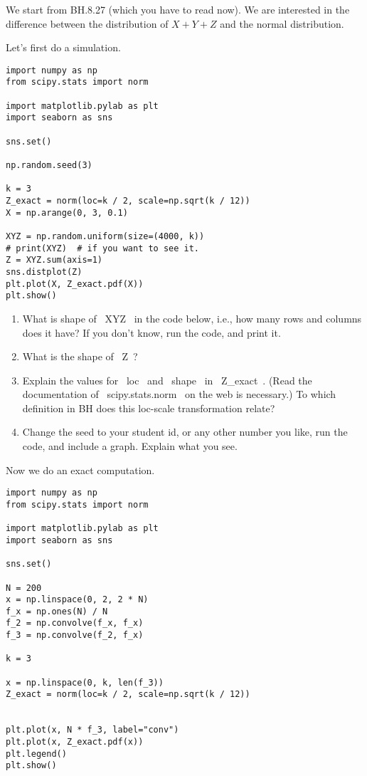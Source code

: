 \documentclass[assignments]{subfiles}
\begin{document}
\begin{exercise}
We start from BH.8.27 (which you have to read now).  We are interested in the difference between the distribution of $X+Y+Z$ and the normal distribution.

Let's first do a simulation.

\begin{verbatim}
import numpy as np
from scipy.stats import norm

import matplotlib.pylab as plt
import seaborn as sns

sns.set()

np.random.seed(3)

k = 3
Z_exact = norm(loc=k / 2, scale=np.sqrt(k / 12))
X = np.arange(0, 3, 0.1)

XYZ = np.random.uniform(size=(4000, k))
# print(XYZ)  # if you want to see it.
Z = XYZ.sum(axis=1)
sns.distplot(Z)
plt.plot(X, Z_exact.pdf(X))
plt.show()
\end{verbatim}


\begin{enumerate}
\item What is shape of ~XYZ~ in the code below, i.e., how many rows and columns does it have? If you don't know, run the code, and print it.
\item What is the shape of ~Z~?
\item Explain the values for ~loc~ and ~shape~ in ~Z_exact~. (Read the documentation of ~scipy.stats.norm~ on the web is necessary.) To which definition in BH does this loc-scale transformation relate?
\item Change the seed to your student id, or any other number you like, run the code, and include a graph. Explain what you see.
\end{enumerate}

Now we do an exact computation.

\begin{verbatim}
import numpy as np
from scipy.stats import norm

import matplotlib.pylab as plt
import seaborn as sns

sns.set()

N = 200
x = np.linspace(0, 2, 2 * N)
f_x = np.ones(N) / N
f_2 = np.convolve(f_x, f_x)
f_3 = np.convolve(f_2, f_x)

k = 3

x = np.linspace(0, k, len(f_3))
Z_exact = norm(loc=k / 2, scale=np.sqrt(k / 12))


plt.plot(x, N * f_3, label="conv")
plt.plot(x, Z_exact.pdf(x))
plt.legend()
plt.show()
\end{verbatim}


\end{exercise}
\end{document}
